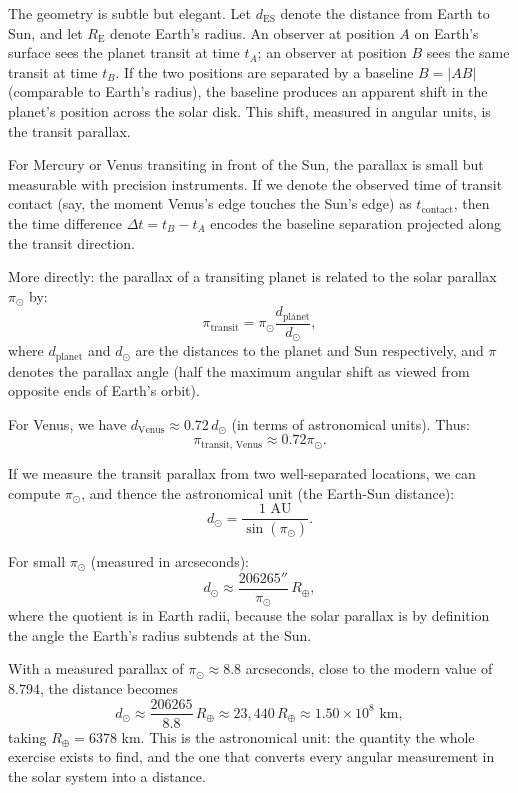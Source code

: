 The geometry is subtle but elegant. Let $d_{\text{ES}}$ denote the distance from Earth to Sun, and let $R_{\text{E}}$ denote Earth's radius. An observer at position $A$ on Earth's surface sees the planet transit at time $t_A$; an observer at position $B$ sees the same transit at time $t_B$. If the two positions are separated by a baseline $B = |AB|$ (comparable to Earth's radius), the baseline produces an apparent shift in the planet's position across the solar disk. This shift, measured in angular units, is the transit parallax.

For Mercury or Venus transiting in front of the Sun, the parallax is small but measurable with precision instruments. If we denote the observed time of transit contact (say, the moment Venus's edge touches the Sun's edge) as $t_{\text{contact}}$, then the time difference $\Delta t = t_B - t_A$ encodes the baseline separation projected along the transit direction.

More directly: the parallax of a transiting planet is related to the solar parallax $\pi_{\odot}$ by:
\[
  \pi_{\text{transit}} = \pi_{\odot} \frac{d_{\text{planet}}}{d_{\odot}},
\]
where $d_{\text{planet}}$ and $d_{\odot}$ are the distances to the planet and Sun respectively, and $\pi$ denotes the parallax angle (half the maximum angular shift as viewed from opposite ends of Earth's orbit).

For Venus, we have $d_{\text{Venus}} \approx 0.72 \, d_{\odot}$ (in terms of astronomical units). Thus:
\[
  \pi_{\text{transit, Venus}} \approx 0.72 \pi_{\odot}.
\]

If we measure the transit parallax from two well-separated locations, we can compute $\pi_{\odot}$, and thence the astronomical unit (the Earth-Sun distance):
\[
  d_{\odot} = \frac{1 \text{ AU}}{\sin(\pi_{\odot})}.
\]

For small $\pi_{\odot}$ (measured in arcseconds):
\[
  d_{\odot} \approx \frac{206265''}{\pi_{\odot}} \, R_{\oplus},
\]
where the quotient is in Earth radii, because the solar parallax is by definition the angle the Earth's radius subtends at the Sun.

With a measured parallax of $\pi_{\odot} \approx 8.8$ arcseconds, close to the modern value of $8.794$, the distance becomes
\[
  d_{\odot} \approx \frac{206265}{8.8} \, R_{\oplus} \approx 23{,}440 \, R_{\oplus} \approx 1.50 \times 10^{8} \text{ km},
\]
taking $R_{\oplus} = 6378$ km. This is the astronomical unit: the quantity the whole exercise exists to find, and the one that converts every angular measurement in the solar system into a distance.

